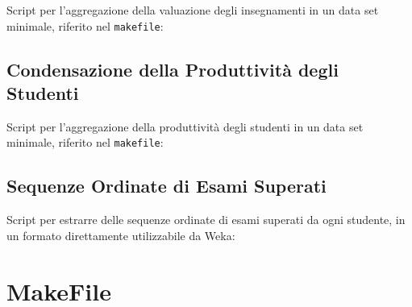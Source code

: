 \begin{appendices}
            Script per l'aggregazione della valuazione degli insegnamenti in un data set minimale, riferito nel \texttt{makefile}: \\
            

        \subsection{Condensazione della Produttività degli Studenti}
        \label{appendix:stud}

            Script per l'aggregazione della produttività degli studenti in un data set minimale, riferito nel \texttt{makefile}: \\
            

        \subsection{Sequenze Ordinate di Esami Superati}
        \label{appendix:seq}

            Script per estrarre delle sequenze ordinate di esami superati da ogni studente, in un formato direttamente utilizzabile da Weka: \\
            

    \section{MakeFile}
    \label{appendix:makefile}
	    

\end{appendices}
